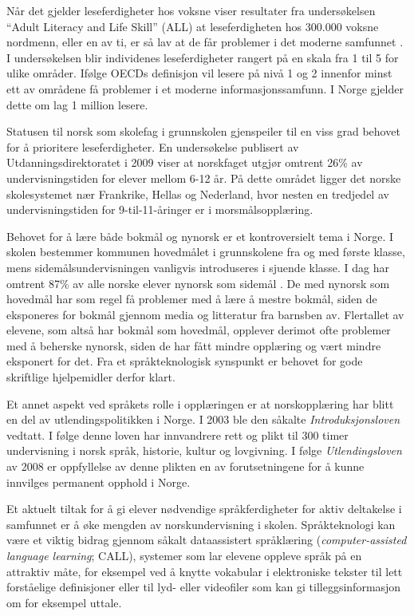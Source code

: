 \begin{multicols}{2}
Når det gjelder leseferdigheter hos voksne viser resultater fra undersøkelsen ``Adult Literacy and Life Skill'' (ALL) at leseferdigheten hos 300.000 voksne nordmenn, eller en av ti, er så lav at de får problemer i det moderne samfunnet \cite{gab:2005}. 
I undersøkelsen blir individenes leseferdigheter rangert på en skala fra 1 til 5 for ulike områder. Ifølge OECDs definisjon vil lesere på nivå 1 og 2 innenfor minst ett av områdene få problemer i et moderne informasjonssamfunn. I Norge gjelder dette om lag 1 million lesere.

Statusen til norsk som skolefag i grunnskolen gjenspeiler til en viss grad behovet for å prioritere leseferdigheter. En undersøkelse publisert av Utdanningsdirektoratet i 2009 viser at norskfaget utgjør omtrent 26\% av undervisningstiden for elever mellom 6-12 år. 
På dette området ligger det norske skolesystemet nær Frankrike, Hellas og Nederland, hvor nesten en tredjedel av undervisningstiden for 9-til-11-åringer er i morsmålsopplæring. 

Behovet for å lære både bokmål og nynorsk er et kontroversielt tema i Norge. I skolen bestemmer kommunen hovedmålet i grunnskolene fra og med første klasse, mens sidemålsundervisningen vanligvis introduseres i sjuende klasse. I dag har omtrent 87\% av alle norske elever nynorsk som sidemål \cite{SR:2010}.
De med nynorsk som hovedmål har som regel få problemer med å lære å mestre bokmål, siden de eksponeres for bokmål gjennom media og litteratur fra barnsben av. Flertallet av elevene, som altså har bokmål som hovedmål, opplever derimot ofte problemer med å beherske nynorsk, siden de har fått mindre opplæring og vært mindre eksponert for det. Fra et språkteknologisk synspunkt er behovet for gode skriftlige hjelpemidler derfor klart.

Et annet aspekt ved språkets rolle i opplæringen er at norskopplæring har blitt en del av utlendingspolitikken i Norge.
I 2003 ble den såkalte \textit{Introduksjonsloven} vedtatt. I følge denne loven har innvandrere rett og plikt til 300 timer undervisning i norsk språk, historie, kultur og lovgivning. 
I følge \textit{Utlendingsloven} av 2008 er oppfyllelse av denne plikten en av forutsetningene for å kunne innvilges permanent opphold i Norge. 

Et aktuelt tiltak for å gi elever nødvendige språkferdigheter for aktiv deltakelse i samfunnet er å øke mengden av norskundervisning i skolen. 
Språkteknologi kan være et viktig bidrag gjennom såkalt dataassistert språklæring (\textit{computer-assisted language learning}; CALL), systemer som lar elevene oppleve språk på en attraktiv måte, for eksempel ved å knytte vokabular i elektroniske tekster til lett forståelige definisjoner eller til lyd- eller  videofiler som kan gi tilleggsinformasjon om for eksempel uttale.


\end{multicols}
